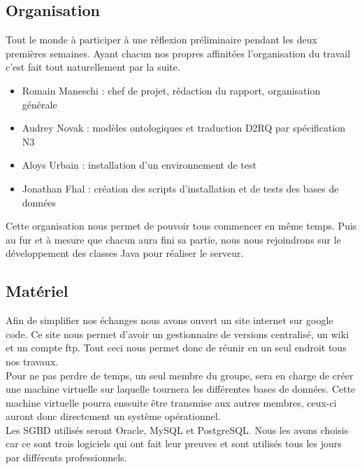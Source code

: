 \documentclass[12pt]{article}
\begin{document}
\subsection{Organisation}

	Tout le monde à participer à une réflexion préliminaire pendant les deux premières semaines.
	Ayant chacun nos propres affinitées l'organisation du travail c'est fait tout naturellement par la suite.\\
	\begin{itemize}
		\item Romain Maneschi : chef de projet, rédaction du rapport, organisation générale\\
		\item Audrey Novak : modèles ontologiques et traduction D2RQ par spécification N3\\
		\item Aloys Urbain : installation d'un environnement de test\\
		\item Jonathan Fhal : création des scripts d'installation et de tests des bases de données\\
	\end{itemize}
	
	Cette organisation nous permet de pouvoir tous commencer en même temps. Puis au fur et à mesure que chacun aura fini sa partie, nous nous rejoindrons sur le développement des classes Java pour réaliser le serveur.

\subsection{Matériel}

	Afin de simplifier nos échanges nous avons ouvert un site internet sur google code. Ce site nous permet d'avoir un gestionnaire de versions centralisé, un wiki et un compte ftp. Tout ceci nous permet donc de réunir en un seul endroit tous nos travaux.\\
	\indent Pour ne pas perdre de temps, un seul membre du groupe, sera en charge de créer une machine virtuelle sur laquelle tournera les différentes bases de données. Cette machine virtuelle pourra enssuite être transmise aux autres membres, ceux-ci auront donc directement un système opérationnel.\\
	\indent Les SGBD utilisés seront Oracle, MySQL et PostgreSQL. Nous les avons choisis car ce sont trois logiciels qui ont fait leur preuves et sont utilisés tous les jours par différents professionnels. 
	
\end{document}

